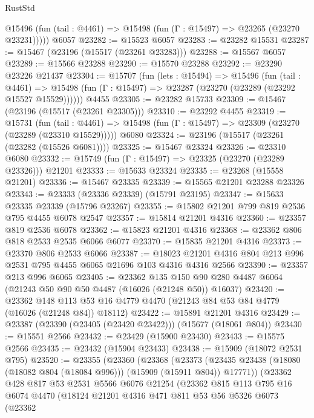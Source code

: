 \begin{lexlean}{RustStd}
\begin{coremodule}
      @15496 (fun (tail : @4461) => @15498 (fun (Γ : @15497) => @23265 (@23270 @23231)))))
    @6057
@23282 := @15523 @6057
@23283 := @23282 @15531
@23287 := @15467 (@23196 (@15517 (@23261 @23283)))
@23288 := @15567 @6057
@23289 := @15566 @23288
@23290 := @15570 @23288
@23292 := @23290 @23226 @21437
@23304 := @15707
    (fun (lets : @15494) =>
    @15496
      (fun (tail : @4461) =>
      @15498 (fun (Γ : @15497) => @23287 (@23270 (@23289 (@23292 @15527 @15529))))))
    @4455
@23305 := @23282 @15733
@23309 := @15467 (@23196 (@15517 (@23261 @23305)))
@23310 := @23292 @4455
@23319 := @15731
    (fun (tail : @4461) => @15498 (fun (Γ : @15497) => @23309 (@23270 (@23289 (@23310 @15529)))))
    @6080
@23324 := @23196 (@15517 (@23261 (@23282 (@15526 @6081))))
@23325 := @15467 @23324
@23326 := @23310 @6080
@23332 := @15749 (fun (Γ : @15497) => @23325 (@23270 (@23289 @23326))) @21201
@23333 := @15633 @23324
@23335 := @23268 (@15558 @21201)
@23336 := @15467 @23335
@23339 := @15565 @21201 @23288 @23326
@23343 := @23333 (@23336 @23339) (@15791 @23195)
@23347 := @15633 @23335 @23339 (@15796 @23267)
@23355 := @15802 @21201 @799 @819 @2536 @795 @4455 @6078 @2547
@23357 := @15814 @21201 @4316
@23360 := @23357 @819 @2536 @6078
@23362 := @15823 @21201 @4316
@23368 := @23362 @806 @818 @2533 @2535 @6066 @6077
@23370 := @15835 @21201 @4316
@23373 := @23370 @806 @2533 @6066
@23387 := @18023 @21201 @4316 @804 @213 @996 @2531 @795 @4455 @6065 @21696 @103 @4316 @4316 @2566
@23390 := @23357 @213 @996 @6065
@23405 := @23362
    @135
    @150
    @90
    @280
    @4487
    @6064
    (@21243 @50 @90 @50 @4487 (@16026 (@21248 @50)) @16037)
@23420 := @23362
    @148
    @113
    @53
    @16
    @4779
    @4470
    (@21243 @84 @53 @84 @4779 (@16026 (@21248 @84)) @18112)
@23422 := @15891 @21201 @4316
@23429 := @23387 (@23390 (@23405 (@23420 @23422))) (@15677 (@18061 @804))
@23430 := @15551 @2566
@23432 := @23429 (@15900 @23430)
@23433 := @15575 @2566
@23435 := @23432 (@15904 @23433)
@23438 := @15909 (@18072 @2531 @795)
@23520 := @23355
    (@23360
      (@23368
        (@23373 (@23435 @23438 (@18080 (@18082 @804 (@18084 @996))) (@15909 (@15911 @804)) @17771))
        (@23362
          @428
          @817
          @53
          @2531
          @5566
          @6076
          @21254
          (@23362
            @815
            @113
            @795
            @16
            @6074
            @4470
            (@18124
              @21201
              @4316
              @471
              @811
              @53
              @56
              @5326
              @6073
              (@23362

\end{coremodule}
\end{lexlean}
